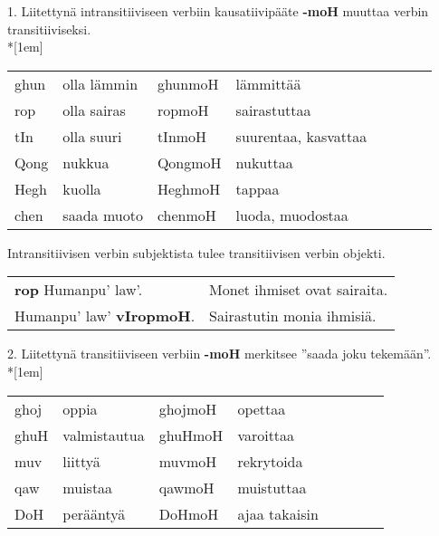 \documentclass{book}
\begin{document}
1. Liitettynä intransitiiviseen verbiin kausatiivipääte \textbf{-moH} muuttaa verbin transitiiviseksi.
\\*[1em]
\begin{tabular}{Bl Il | Bl Il}
    ghun & olla lämmin & ghunmoH & lämmittää \\
    rop & olla sairas & ropmoH & sairastuttaa \\
    tIn & olla suuri & tInmoH & suurentaa, kasvattaa \\
    Qong & nukkua & QongmoH & nukuttaa \\
    Hegh & kuolla & HeghmoH & tappaa \\
    chen & saada muoto & chenmoH & luoda, muodostaa \\
\end{tabular}

Intransitiivisen verbin subjektista tulee transitiivisen verbin objekti.

\ifxetex
\else
    \begin{tabular}{l l}
        \textbf{rop} Humanpu' law'. & Monet ihmiset ovat sairaita. \\
        Humanpu' law' \textbf{vIropmoH}. & Sairastutin monia ihmisiä. \\
    \end{tabular}
\fi

2. Liitettynä transitiiviseen verbiin \textbf{-moH} merkitsee ''saada joku tekemään''.\\*[1em]
\begin{tabular}{Bl Il | Bl Il}
    ghoj & oppia & ghojmoH & opettaa \\
    ghuH & valmistautua & ghuHmoH & varoittaa \\
    muv & liittyä & muvmoH & rekrytoida \\
    qaw & muistaa & qawmoH & muistuttaa \\
    DoH & perääntyä & DoHmoH & ajaa takaisin \\
\end{tabular}
\end{document}
